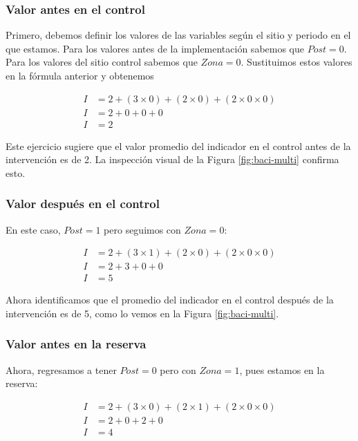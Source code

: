 \documentclass[]{krantz}
\begin{document}
\hypertarget{valor-antes-en-el-control}{%
\subsubsection{Valor antes en el
control}\label{valor-antes-en-el-control}}

Primero, debemos definir los valores de las variables según el sitio y
periodo en el que estamos. Para los valores antes de la implementación
sabemos que \(Post = 0\). Para los valores del sitio control sabemos que
\(Zona = 0\). Sustituimos estos valores en la fórmula anterior y
obtenemos

\[
\begin{split}
I &= 2 + (3 \times 0) + (2\times 0) + (2 \times 0 \times 0) \\
I &= 2 + 0 + 0 + 0 \\
I &= 2
\end{split}
\]

Este ejercicio sugiere que el valor promedio del indicador en el control
antes de la intervención es de 2. La inspección visual de la Figura
\ref{fig:baci-multi} confirma esto.

\hypertarget{valor-despues-en-el-control}{%
\subsubsection{Valor después en el
control}\label{valor-despues-en-el-control}}

En este caso, \(Post = 1\) pero seguimos con \(Zona = 0\):

\[
\begin{split}
I &= 2 + (3 \times 1) + (2\times 0) + (2 \times 0 \times 0) \\
I &= 2 + 3 + 0 + 0 \\
I &= 5
\end{split}
\]

Ahora identificamos que el promedio del indicador en el control después
de la intervención es de 5, como lo vemos en la Figura
\ref{fig:baci-multi}.

\hypertarget{valor-antes-en-la-reserva}{%
\subsubsection{Valor antes en la
reserva}\label{valor-antes-en-la-reserva}}

Ahora, regresamos a tener \(Post = 0\) pero con \(Zona = 1\), pues
estamos en la reserva:

\[
\begin{split}
I &= 2 + (3 \times 0) + (2\times 1) + (2 \times 0 \times 0) \\
I &= 2 + 0 + 2 + 0 \\
I &= 4
\end{split}
\]
\end{document}
